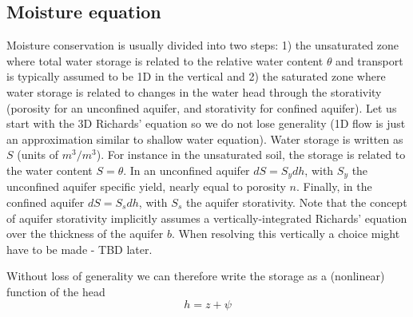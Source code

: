 \documentclass{article}
\begin{document}
\begin{table}[]
\caption{List of heat eqs variables}
\end{table}


\subsection{Moisture equation}
Moisture conservation is usually divided into two steps: 1) the unsaturated zone where total water storage is related to the relative water content $\theta$ and transport is typically assumed to be 1D in the vertical and 2) the saturated zone where water storage is related to changes in the water head through the storativity (porosity for an unconfined aquifer, and storativity for confined aquifer).
Let us start with the 3D Richards' equation so we do not lose generality (1D flow is just an approximation similar to shallow water equation). Water storage is written as $S$ (units of $m^3/m^3$). For instance in the unsaturated soil, the storage is related to the water content $S=\theta$. In an unconfined aquifer $dS=S_y dh$, with $S_y$ the unconfined aquifer specific yield, nearly equal to porosity $n$. Finally, in the confined aquifer $dS=S_s dh$, with $S_s$ the aquifer storativity. Note that the concept of aquifer storativity implicitly assumes a vertically-integrated Richards' equation over the thickness of the aquifer $b$. When resolving this vertically a choice might have to be made - TBD later.

Without loss of generality we can therefore write the storage as a (nonlinear) function of the head 
\begin{equation}
     h=z+\psi
\label{head}
\end{equation}
\end{document}
